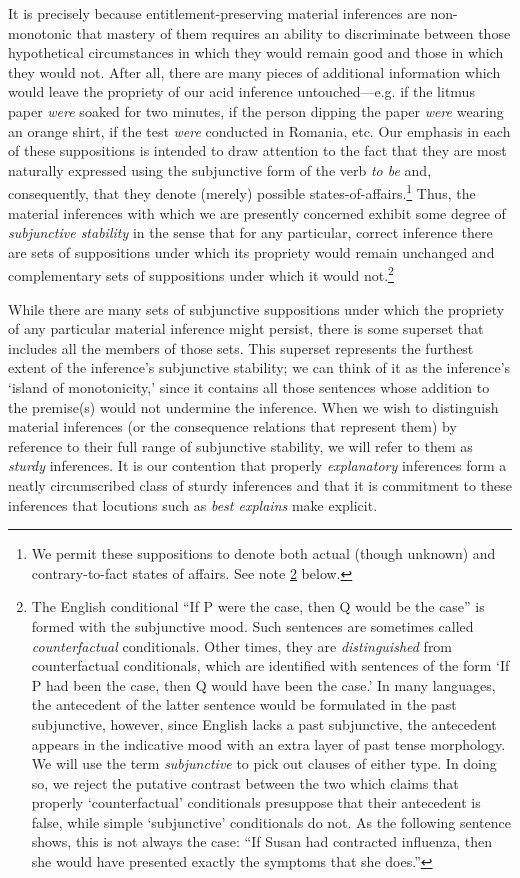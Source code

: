 \documentclass{svjour3}                     %
\begin{document}
It is precisely because entitlement-preserving material inferences are non-monotonic that mastery of them requires an ability to discriminate between those hypothetical circumstances in which they would remain good and those in which they would not.  After all, there are many pieces of additional information which would leave the propriety of our acid inference untouched---e.g. if the litmus paper \textit{were} soaked for two minutes, if the person dipping the paper \textit{were} wearing an orange shirt, if the test \textit{were} conducted in Romania, etc. Our emphasis in each of these suppositions is intended to draw attention to the fact that they are most naturally expressed using the subjunctive form of the verb \textit{to be} and, consequently, that they denote (merely) possible states-of-affairs.\footnote{We permit these suppositions to denote both actual (though unknown) and contrary-to-fact states of affairs. See note \ref{Grammar} below.} Thus, the material inferences with which we are presently concerned exhibit some degree of \textit{subjunctive stability} in the sense that for any particular, correct inference there are sets of suppositions under which its propriety would remain unchanged and complementary sets of suppositions under which it would not.\footnote{\label{Grammar}The English conditional ``If P were the case, then Q would be the case''  is formed with the subjunctive mood. Such sentences are sometimes called \textit{counterfactual} conditionals. Other times, they are \textit{distinguished} from counterfactual conditionals, which are identified with sentences of the form `If P had been the case, then Q would have been the case.' In many languages, the antecedent of the latter sentence would be formulated in the past subjunctive, however, since English lacks a past subjunctive, the antecedent appears in the indicative mood with an extra layer of past tense morphology. We will use the term \textit{subjunctive} to pick out clauses of either type. In doing so, we reject the putative contrast between the two which claims that properly `counterfactual' conditionals presuppose that their antecedent is false, while simple `subjunctive' conditionals do not. As the following sentence shows, this is not always the case: ``If Susan had contracted influenza, then she would have presented exactly the symptoms that she does.''}  

While there are many sets of subjunctive suppositions under which the propriety of any particular material inference might persist, there is some superset that includes all the members of those sets. This superset represents the furthest extent of the inference's subjunctive stability; we can think of it as the inference's `island of monotonicity,' since it contains all those sentences whose addition to the premise(s) would not undermine the inference. When we wish to distinguish material inferences (or the consequence relations that represent them) by reference to their full range of subjunctive stability, we will refer to them as \textit{sturdy} inferences. It is our contention that properly \textit{explanatory} inferences form a neatly circumscribed class of sturdy inferences and that it is commitment to these inferences that locutions such as  \textit{best explains} make explicit.
\end{document}
